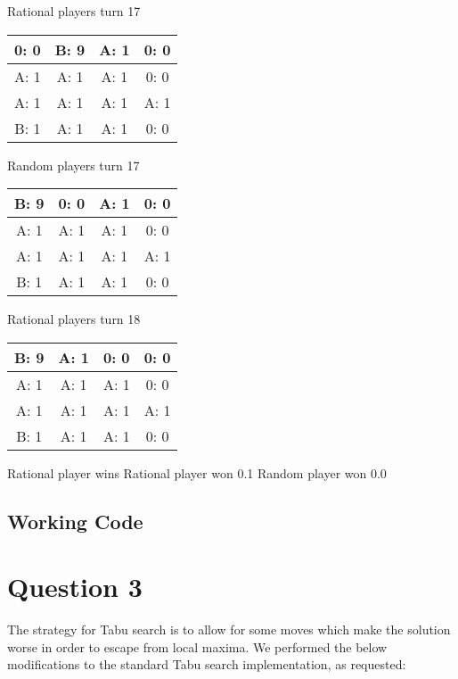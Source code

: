 \documentclass[12pt]{article}
\begin{document}
Rational players turn 17
\begin{center}
\begin{tabular}{|c|c|c|c|}
\hline
0: 0  & B: 9  & A: 1  & 0: 0  \\ \hline
A: 1  & A: 1  & A: 1  & 0: 0  \\ \hline
A: 1  & A: 1  & A: 1  & A: 1  \\ \hline
B: 1  & A: 1  & A: 1  & 0: 0  \\ \hline
\end{tabular}
\end{center}
Random players turn 17
\begin{center}
\begin{tabular}{|c|c|c|c|}
\hline
B: 9  & 0: 0  & A: 1  & 0: 0  \\ \hline
A: 1  & A: 1  & A: 1  & 0: 0  \\ \hline
A: 1  & A: 1  & A: 1  & A: 1  \\ \hline
B: 1  & A: 1  & A: 1  & 0: 0  \\ \hline
\end{tabular}
\end{center}

Rational players turn 18
\begin{center}
\begin{tabular}{|c|c|c|c|}
\hline
B: 9  & A: 1  & 0: 0  & 0: 0  \\ \hline
A: 1  & A: 1  & A: 1  & 0: 0  \\ \hline
A: 1  & A: 1  & A: 1  & A: 1  \\ \hline
B: 1  & A: 1  & A: 1  & 0: 0  \\ \hline
\end{tabular}
\end{center}
Rational player wins
Rational player won 0.1
Random player won 0.0

\subsection*{Working Code}


\section*{Question 3}
The strategy for Tabu search is to allow for some moves which make the solution worse in order to escape from local maxima. We performed the below modifications to the standard Tabu search implementation, as requested:
\end{document}
